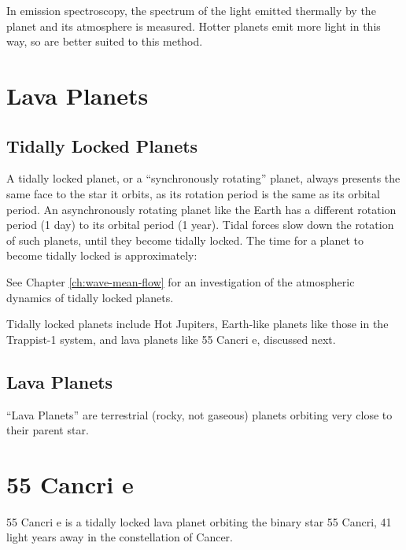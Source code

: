 In emission spectroscopy, the spectrum of the light emitted thermally by the planet and its atmosphere is measured. Hotter planets emit more light in this way, so are better suited to this method.





\section{Lava Planets}

\subsection{Tidally Locked Planets}

A tidally locked planet, or a ``synchronously rotating'' planet, always presents the same face to the star it orbits, as its rotation period is the same as its orbital period. An asynchronously rotating planet like the Earth has a different rotation period (1 day) to its orbital period (1 year). Tidal forces slow down the rotation of such planets, until they become tidally locked. The time for a planet to become tidally locked is approximately:


See Chapter \ref{ch:wave-mean-flow} for an investigation of the atmospheric dynamics of tidally locked planets.

Tidally locked planets include Hot Jupiters, Earth-like planets like those in the Trappist-1 system, and lava planets like 55 Cancri e, discussed next.



\subsection{Lava Planets}

``Lava Planets'' are terrestrial (rocky, not gaseous) planets orbiting very close to their parent star.


\section{55 Cancri e}

55 Cancri e is a tidally locked lava planet orbiting the binary star 55 Cancri, 41 light years away in the constellation of Cancer.

